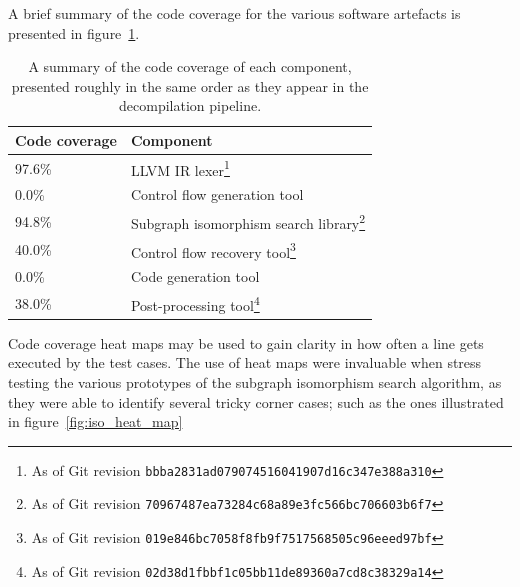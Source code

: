 A brief summary of the code coverage for the various software artefacts is presented in figure~\ref{tbl:code_coverage_summary}.

\begin{savenotes}
	\begin{table}[htbp]
		\begin{center}
			\begin{tabular}{|l|l|}
				\hline
				Code coverage & Component \\
				\hline
				97.6\% & LLVM IR lexer\footnote{As of Git revision \texttt{bbba2831ad079074516041907d16c347e388a310}} \\
				0.0\% & Control flow generation tool \\
				94.8\% & Subgraph isomorphism search library\footnote{As of Git revision \texttt{70967487ea73284c68a89e3fc566bc706603b6f7}} \\
				40.0\% & Control flow recovery tool\footnote{As of Git revision \texttt{019e846bc7058f8fb9f7517568505c96eeed97bf}} \\
				0.0\% & Code generation tool \\
				38.0\% & Post-processing tool\footnote{As of Git revision \texttt{02d38d1fbbf1c05bb11de89360a7cd8c38329a14}} \\
				\hline
			\end{tabular}
		\end{center}
		\caption{A summary of the code coverage of each component, presented roughly in the same order as they appear in the decompilation pipeline.}
		\label{tbl:code_coverage_summary}
	\end{table}
\end{savenotes}

Code coverage heat maps may be used to gain clarity in how often a line gets executed by the test cases. The use of heat maps were invaluable when stress testing the various prototypes of the subgraph isomorphism search algorithm, as they were able to identify several tricky corner cases; such as the ones illustrated in figure~\ref{fig:iso_heat_map}

